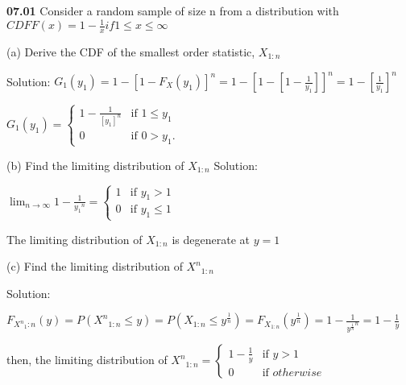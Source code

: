 {\bf 07.01} Consider a random sample of size n from a distribution with $CDF F(x) = 1-\frac{1}{x} if 1 \leq x \leq \infty$

\vspace{5mm}

(a)  Derive the CDF of the smallest order statistic, $X_{1 \colon n}$

\vspace{3mm}
Solution: $G_{1}(y_1) = 1-[1-F_X(y_1)]^n  = 1-[1-[1-\frac{1}{y_1}]]^n = 1-[\frac{1}{y_1}]^n$

\vspace{2mm}
$G_1(y_1) = \begin{cases} 1-\frac{1}{[y_1]^n} &\mbox{if }  1\leq y_1 \\ 0 &\mbox{if } 0>y_1. \end{cases} $


\vspace{10mm}
(b) Find the limiting distribution of $ X_{1\colon{n}}$
\vspace{3mm}
Solution: 

\vspace{2mm}
$\lim_{n \rightarrow \infty} 1-\frac{1}{{y_1}^n} = \begin{cases} 1 &\mbox{if } y_{1} > 1 \\ 0 &\mbox{if } y_1 \leq 1 \end{cases}$

\vspace{2mm}
The limiting distribution of $X_{1\colon n}$ is degenerate at $y = 1$

\vspace{10mm}
(c) Find the limiting distribution of ${X^n}_{1\colon n}$

\vspace{3mm}
Solution:

\vspace{2mm}
$F_{{X^n}_1\colon n} (y) = P({X^n}_{1\colon n} \leq y) = P(X_{1\colon n} \leq y^{\frac{1}{n}}) = F_{X_{1\colon n}} (y^{\frac{1}{n}}) = 1-\frac{1}{{y^\frac{1}{n}}^n} = 1 - \frac{1}{y}$

\vspace{2mm}
then, the limiting distribution of ${X^n}_{1\colon n} = \begin{cases} 1- \frac{1}{y} &\mbox {if } y >1 \\ 0 &\mbox {if } otherwise \end{cases}$
